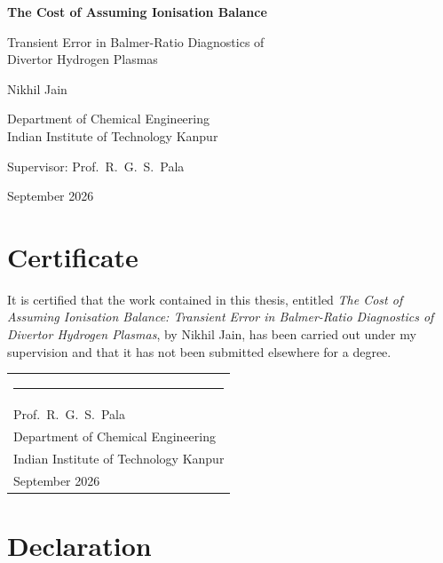 \documentclass[12pt,a4paper,oneside]{report}
\begin{document}
\begin{titlepage}
\centering
\vspace*{2cm}
{\LARGE\bfseries The Cost of Assuming Ionisation Balance\par}
\vspace{0.6cm}
{\large Transient Error in Balmer-Ratio Diagnostics of\\
Divertor Hydrogen Plasmas\par}
\vfill
{\large Nikhil Jain\par}
\vspace{0.4cm}
{\normalsize Department of Chemical Engineering\\
Indian Institute of Technology Kanpur\par}
\vspace{1cm}
{\normalsize Supervisor: Prof.\ R.\ G.\ S.\ Pala\par}
\vfill
{\normalsize September 2026\par}
\end{titlepage}

\chapter*{Certificate}
\thispagestyle{empty}

It is certified that the work contained in this thesis, entitled \emph{The Cost
of Assuming Ionisation Balance: Transient Error in Balmer-Ratio Diagnostics of
Divertor Hydrogen Plasmas}, by Nikhil Jain, has been carried out under my
supervision and that it has not been submitted elsewhere for a degree.

\vspace{3cm}
\noindent
\begin{tabular}{@{}l@{}}
  \rule{6cm}{0.4pt}\\
  Prof.\ R.\ G.\ S.\ Pala\\
  Department of Chemical Engineering\\
  Indian Institute of Technology Kanpur\\
  September 2026
\end{tabular}

\chapter*{Declaration}
\thispagestyle{empty}
\end{document}
